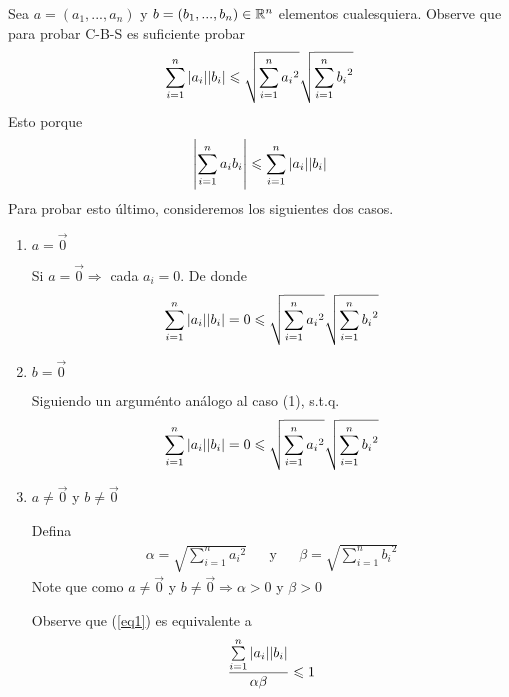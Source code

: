         \begin{explanation}
            Sea $a=({a}_{1},...,{a}_{n})$ y $b=({b}_{1},...,{b}_{n}) \in \mathbb{R}^n$ elementos cualesquiera. Observe que para probar C-B-S es suficiente probar 
            \begin{equation}
                \sum_{i=1}^{n} \abs{{a}_{i}}\abs{{b}_{i}} \leqslant \sqrt{\sum_{i=1}^{n} {{a}_{i}}^{2}} \sqrt{\sum_{i=1}^{n} {{b}_{i}}^{2}} \label{eq1}
            \end{equation}
            Esto porque 
            \begin{equation*}
                \abs{\sum_{i=1}^{n} {a}_{i}{b}_{i}} \leqslant \sum_{i=1}^{n} \abs{{a}_{i}}\abs{{b}_{i}}
            \end{equation*}
            Para probar esto último, consideremos los siguientes dos casos.
            \begin{enumerate}[label=\alph*)]
                \item $a=\vec{0}$
                
                Si $a=\vec{0} \Rightarrow$ cada $a_i = 0$. De donde
                \begin{equation*}
                    \sum_{i=1}^{n} \abs{{a}_{i}}\abs{{b}_{i}} = 0\leqslant \sqrt{\sum_{i=1}^{n} {{a}_{i}}^{2}} \sqrt{\sum_{i=1}^{n} {{b}_{i}}^{2}}
                \end{equation*}
                \item $b=\vec{0}$
                
                Siguiendo un arguménto análogo al caso (1), s.t.q. 
                \begin{equation*}
                    \sum_{i=1}^{n} \abs{{a}_{i}}\abs{{b}_{i}} = 0\leqslant \sqrt{\sum_{i=1}^{n} {{a}_{i}}^{2}} \sqrt{\sum_{i=1}^{n} {{b}_{i}}^{2}}
                \end{equation*}

                \item $a \neq \vec{0}$ y $b \neq \vec{0}$

                Defina 
                \begin{align*}
                    \alpha = \sqrt{\sum_{i=1}^{n} {{a}_{i}}^{2}} & & \text{y} & & \beta = \sqrt{\sum_{i=1}^{n} {{b}_{i}}^{2}}
                \end{align*}
                Note que como $a \neq \vec{0}$ y $b \neq \vec{0} \Rightarrow \alpha > 0$ y $\beta >0$

                Observe que (\ref{eq1}) es equivalente a 
                \begin{equation}
                    \frac{\sum\limits_{i=1}^{n} \abs{{a}_{i}}\abs{{b}_{i}}}{\alpha \beta} \leqslant 1\label{eq2}
                \end{equation}


\end{enumerate}
\end{explanation}
